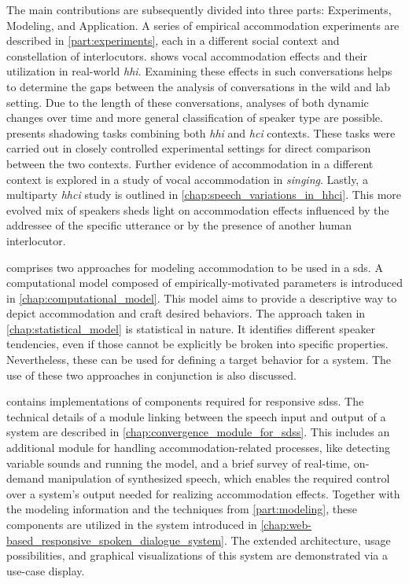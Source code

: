 The main contributions are subsequently divided into three parts: Experiments, Modeling, and Application.
A series of empirical accommodation experiments are described in \cref{part:experiments}, each in a different social context and constellation of interlocutors.
 shows vocal accommodation effects and their utilization in real-world \emph{\acl{hhi}}.
Examining these effects in such conversations helps to determine the gaps between the analysis of conversations in the wild and lab setting.
Due to the length of these conversations, analyses of both dynamic changes over time and more general classification of speaker type are possible.
 presents shadowing tasks combining both \emph{\acl{hhi}} and \emph{\acl{hci}} contexts.
These tasks were carried out in closely controlled experimental settings for direct comparison between the two contexts.
Further evidence of accommodation in a different context is explored in a study of vocal accommodation in \emph{singing}.
Lastly, a multiparty \emph{\acl{hhci}} study is outlined in \cref{chap:speech_variations_in_hhci}.
This more evolved mix of speakers sheds light on accommodation effects influenced by the addressee of the specific utterance or by the presence of another human interlocutor.

 comprises two approaches for modeling accommodation to be used in a \acl{sds}.
A computational model composed of empirically-motivated parameters is introduced in \cref{chap:computational_model}.
This model aims to provide a descriptive way to depict accommodation and craft desired behaviors.
The approach taken in \cref{chap:statistical_model} is statistical in nature.
It identifies different speaker tendencies, even if those cannot be explicitly be broken into specific properties.
Nevertheless, these can be used for defining a target behavior for a system.
The use of these two approaches in conjunction is also discussed.

 contains implementations of components required for responsive \aclp{sds}.
The technical details of a module linking between the speech input and output of a system are described in \cref{chap:convergence_module_for_sdss}.
This includes an additional module for handling accommodation-related processes, like detecting variable sounds and running the model, and a brief survey of real-time, on-demand manipulation of synthesized speech, which enables the required control over a system's output needed for realizing accommodation effects.
Together with the modeling information and the techniques from \cref{part:modeling}, these components are utilized in the system introduced in \cref{chap:web-based_responsive_spoken_dialogue_system}.
The extended architecture, usage possibilities, and graphical visualizations of this system are demonstrated via a use-case display.

